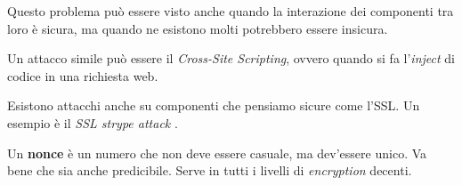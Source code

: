 Questo problema può essere visto anche quando la interazione dei componenti tra 
loro è sicura, ma quando ne esistono molti potrebbero essere insicura.

Un attacco simile può essere il \textit{Cross-Site Scripting}, ovvero quando si 
fa l'\textit{inject} di codice in una richiesta web.


Esistono attacchi anche su componenti che pensiamo sicure come l'SSL. Un esempio 
è il \textit{SSL strype attack} .

Un \textbf{nonce} è un numero che non deve essere casuale, ma dev'essere unico. 
Va bene che sia anche predicibile. Serve in tutti i livelli di 
\textit{encryption} decenti.


